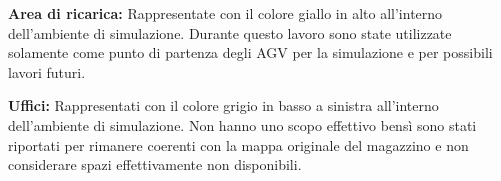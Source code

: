 \documentclass[12pt]{article}
\begin{document}
\begin{minipage}[ht]{0.45\linewidth}
\vspace{0.2cm}
\textbf{Area di ricarica:} Rappresentate con il colore giallo in alto all'interno dell'ambiente di simulazione. Durante questo lavoro sono state utilizzate solamente come punto di partenza degli AGV per la simulazione e per possibili lavori futuri.
\end{minipage}
\hspace{0.5cm}
\begin{minipage}[ht]{0.45\linewidth}
\vspace{0.2cm}
\textbf{Uffici:} Rappresentati con il colore grigio in basso a sinistra all'interno dell'ambiente di simulazione. Non hanno uno scopo effettivo bensì sono stati riportati per rimanere coerenti con la mappa originale del magazzino e non considerare spazi effettivamente non disponibili.
\end{minipage}

\newpage
\end{document}
